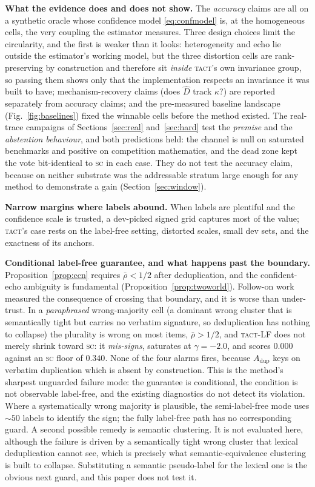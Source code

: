 \documentclass{article}
\newcommand{\Dhat}{\widehat{D}}
\newcommand{\SC}{\textsc{sc}}
\newcommand{\TACT}{\textsc{tact}}
\begin{document}
\textbf{What the evidence does and does not show.} The \emph{accuracy} claims are all on a synthetic oracle whose confidence model \eqref{eq:confmodel} is, at the homogeneous cells, the very coupling the estimator measures. Three design choices limit the circularity, and the first is weaker than it
looks: heterogeneity and echo lie outside the estimator's working model, but
the three distortion cells are rank-preserving by construction and therefore
sit \emph{inside} \TACT's own invariance group, so passing them shows only that the
implementation respects an invariance it was built to have; mechanism-recovery claims (does $\Dhat$ track $\kappa$?) are reported separately from accuracy claims; and the pre-measured baseline landscape (Fig.~\ref{fig:baselines}) fixed the winnable cells before the method existed. The real-trace campaigns of Sections~\ref{sec:real} and~\ref{sec:hard} test the \emph{premise} and the \emph{abstention behaviour}, and both predictions held: the channel is null on saturated benchmarks and positive on competition mathematics, and the dead zone kept the vote bit-identical to \SC{} in each case. They do not test the accuracy claim, because on neither substrate was the addressable stratum large enough for any method to demonstrate a gain (Section~\ref{sec:window}).

\textbf{Narrow margins where labels abound.} When labels are plentiful and the confidence scale is trusted, a dev-picked signed grid captures most of the value; \TACT's case rests on the label-free setting, distorted scales, small dev sets, and the exactness of its anchors.

\textbf{Conditional label-free guarantee, and what happens past the boundary.}
Proposition~\ref{prop:ccn} requires $\bar\rho<1/2$ after deduplication, and the
confident-echo ambiguity is fundamental (Proposition~\ref{prop:twoworld}).
Follow-on work measured the consequence of crossing that boundary, and it is
worse than under-trust. In a \emph{paraphrased} wrong-majority cell (a dominant
wrong cluster that is semantically tight but carries no verbatim signature, so
deduplication has nothing to collapse) the plurality is wrong on most items,
$\bar\rho>1/2$, and \TACT-LF does not merely shrink toward \SC: it
\emph{mis-signs}, saturates at $\gamma=-2.0$, and scores $0.000$ against an
\SC{} floor of $0.340$. None of the four alarms fires, because $A_{\mathrm{dup}}$ keys on
verbatim duplication which is absent by construction. This is the method's
sharpest unguarded failure mode: the guarantee is conditional, the condition is
not observable label-free, and the existing diagnostics do not detect its
violation. Where a systematically wrong majority is plausible, the
semi-label-free mode uses ${\sim}50$ labels to identify the sign; the fully
label-free path has no corresponding guard. A second possible remedy is semantic
clustering. It is not evaluated here, although the failure is driven by a semantically tight wrong cluster that
lexical deduplication cannot see, which is precisely what semantic-equivalence
clustering \citep{kuhn2023semantic} is built to collapse. Substituting a
semantic pseudo-label for the lexical one is the obvious next guard, and this
paper does not test it.
\end{document}
